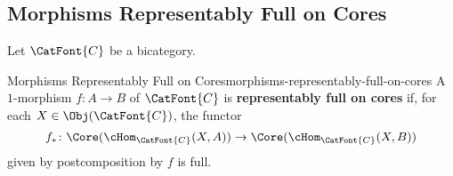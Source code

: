 \subsection{Morphisms Representably Full on Cores}\label{subsection-morphisms-representably-full-on-cores}
Let $\CatFont{C}$ be a bicategory.
\begin{definition}{Morphisms Representably Full on Cores}{morphisms-representably-full-on-cores}%
    A $1$-morphism $f\colon A\to B$ of $\CatFont{C}$ is \textbf{representably full on cores} if, for each $X\in\Obj(\CatFont{C})$, the functor
    \[
        f_{*}%
        \colon%
        \Core(\cHom_{\CatFont{C}}(X,A))%
        \to%
        \Core(\cHom_{\CatFont{C}}(X,B))%
    \]%
    given by postcomposition by $f$ is full.
\end{definition}
